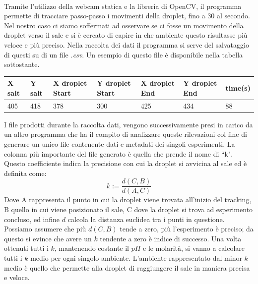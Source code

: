 \\Tramite l'utilizzo della webcam statica e la libreria di OpenCV, il programma permette di tracciare passo-passo i movimenti della droplet, fino a 30 al secondo. \\Nel nostro caso ci siamo soffermati ad osservare se ci fosse un movimento della droplet verso il sale e si è cercato di capire in che ambiente questo risultasse più veloce e più preciso. Nella raccolta dei dati il programma si serve del salvataggio di questi su di un file \emph{.csv}. Un esempio di questo file è disponibile nella tabella sottostante. 
\begin{center}
\begin{tabular}{lllllll}
X salt & Y salt & X droplet Start & Y droplet Start & X droplet End & Y droplet End & time(s) \\
\hline
405    & 418    & 378             & 300             & 425           & 434           & 88  
\end{tabular}
\end{center}
I file prodotti durante la raccolta dati, vengono successivamente presi in carico da un altro programma che ha il compito di analizzare queste rilevazioni col fine di generare un unico file contenente dati e metadati dei singoli esperimenti. La colonna più importante del file generato è quella che prende il nome di ``k". Questo coefficiente indica la precisione con cui la droplet si avvicina al sale ed è definita come:
\begin{equation} 	
	k := \frac { d(C,B) }{ d(A,C) }
\end{equation}
Dove A rappresenta il punto in cui la droplet viene trovata all'inizio del tracking, B quello in cui viene posizionato il sale, C dove la droplet si trova ad esperimento concluso, ed infine $d$ calcola la distanza euclidea tra i punti in questione. 
\\Possiamo assumere che più $d(C,B)$ tende a zero, più l'esperimento è preciso; da questo si evince che avere un $k$ tendente a zero è indice di successo. Una volta ottenuti tutti i $k$, mantenendo costante il $pH$ e le molarità, si vanno a calcolare tutti i $k$ medio per ogni singolo ambiente. L'ambiente rappresentato dal minor $k$ medio è quello che permette alla droplet di raggiungere il sale in maniera precisa e veloce. \\

